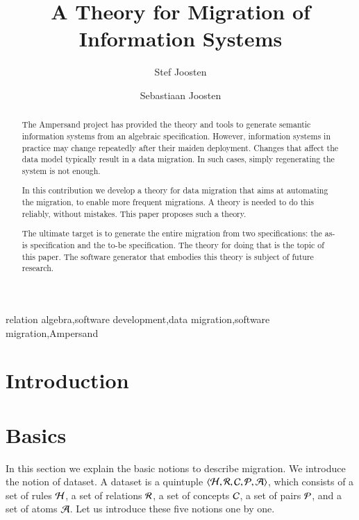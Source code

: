 \documentclass{elsarticle}
\begin{document}


\title{A Theory for Migration of Information Systems}
\author[ou,ordina]{Stef Joosten}
\author[umn]{Sebastiaan Joosten}
\address[ou]{Open Universiteit Nederland, Heerlen, the Netherlands}
\address[ordina]{Ordina NV, Nieuwegein, the Netherlands}
\address[umn]{University of Minnesota, Minneapolis, USA}

\begin{abstract}
	The Ampersand project has provided the theory and tools to generate semantic information systems from an algebraic specification.
	However, information systems in practice may change repeatedly after their maiden deployment.
	Changes that affect the data model typically result in a data migration.
	In such cases, simply regenerating the system is not enough.

	In this contribution we develop a theory for data migration that aims at automating the migration,
	to enable more frequent migrations.
	A theory is needed to do this reliably, without mistakes.
	This paper proposes such a theory.

	The ultimate target is to generate the entire migration from two specifications: the as-is specification and the to-be specification.
	The theory for doing that is the topic of this paper.
	The software generator that embodies this theory is subject of future research.
\end{abstract}

\begin{keyword}
relation algebra\sep software development\sep data migration\sep software migration\sep Ampersand
\end{keyword}
\maketitle

\section{Introduction}
\label{sct:Introduction}

\section{Basics}
\label{sct:Basics}
	In this section we explain the basic notions to describe migration.
	We introduce the notion of dataset.
	A dataset is a quintuple $\langle\mathcal{H},\mathcal{R},\mathcal{C},\mathcal{P},\mathcal{A}\rangle$,
	which consists of a set of rules $\mathcal{H}$, a set of relations $\mathcal{R}$, a set of concepts $\mathcal{C}$, a set of pairs $\mathcal{P}$, and a set of atoms $\mathcal{A}$.
	Let us introduce these five notions one by one.
\end{document}
